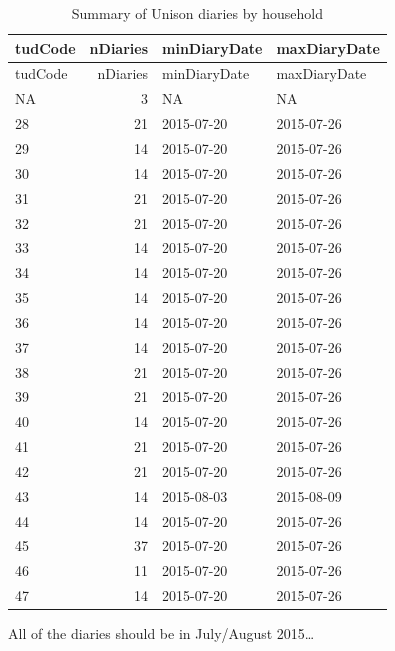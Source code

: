 \documentclass[]{article}
\newenvironment{Shaded}{\begin{snugshade}}{\end{snugshade}}
\newcommand{\KeywordTok}[1]{\textcolor[rgb]{0.13,0.29,0.53}{\textbf{#1}}}
\newcommand{\DataTypeTok}[1]{\textcolor[rgb]{0.13,0.29,0.53}{#1}}
\newcommand{\DecValTok}[1]{\textcolor[rgb]{0.00,0.00,0.81}{#1}}
\newcommand{\FloatTok}[1]{\textcolor[rgb]{0.00,0.00,0.81}{#1}}
\newcommand{\StringTok}[1]{\textcolor[rgb]{0.31,0.60,0.02}{#1}}
\newcommand{\OperatorTok}[1]{\textcolor[rgb]{0.81,0.36,0.00}{\textbf{#1}}}
\newcommand{\NormalTok}[1]{#1}
\begin{document}
\begin{longtable}[]{@{}lrll@{}}
\caption{Summary of Unison diaries by household}\tabularnewline
\toprule
tudCode & nDiaries & minDiaryDate & maxDiaryDate\tabularnewline
\midrule
\endfirsthead
\toprule
tudCode & nDiaries & minDiaryDate & maxDiaryDate\tabularnewline
\midrule
\endhead
NA & 3 & NA & NA\tabularnewline
28 & 21 & 2015-07-20 & 2015-07-26\tabularnewline
29 & 14 & 2015-07-20 & 2015-07-26\tabularnewline
30 & 14 & 2015-07-20 & 2015-07-26\tabularnewline
31 & 21 & 2015-07-20 & 2015-07-26\tabularnewline
32 & 21 & 2015-07-20 & 2015-07-26\tabularnewline
33 & 14 & 2015-07-20 & 2015-07-26\tabularnewline
34 & 14 & 2015-07-20 & 2015-07-26\tabularnewline
35 & 14 & 2015-07-20 & 2015-07-26\tabularnewline
36 & 14 & 2015-07-20 & 2015-07-26\tabularnewline
37 & 14 & 2015-07-20 & 2015-07-26\tabularnewline
38 & 21 & 2015-07-20 & 2015-07-26\tabularnewline
39 & 21 & 2015-07-20 & 2015-07-26\tabularnewline
40 & 14 & 2015-07-20 & 2015-07-26\tabularnewline
41 & 21 & 2015-07-20 & 2015-07-26\tabularnewline
42 & 21 & 2015-07-20 & 2015-07-26\tabularnewline
43 & 14 & 2015-08-03 & 2015-08-09\tabularnewline
44 & 14 & 2015-07-20 & 2015-07-26\tabularnewline
45 & 37 & 2015-07-20 & 2015-07-26\tabularnewline
46 & 11 & 2015-07-20 & 2015-07-26\tabularnewline
47 & 14 & 2015-07-20 & 2015-07-26\tabularnewline
\bottomrule
\end{longtable}

All of the diaries should be in July/August 2015\ldots{}

\begin{Shaded}
\end{Shaded}
\end{document}
